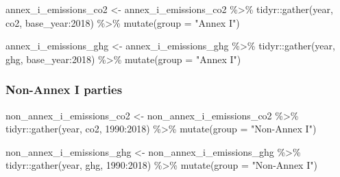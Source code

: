 \documentclass[
  12pt,
]{article}
\newenvironment{Shaded}{}{}
\newcommand{\AttributeTok}[1]{\textcolor[rgb]{0.49,0.56,0.16}{#1}}
\newcommand{\FunctionTok}[1]{\textcolor[rgb]{0.02,0.16,0.49}{#1}}
\newcommand{\NormalTok}[1]{#1}
\newcommand{\OtherTok}[1]{\textcolor[rgb]{0.00,0.44,0.13}{#1}}
\newcommand{\SpecialCharTok}[1]{\textcolor[rgb]{0.25,0.44,0.63}{#1}}
\newcommand{\StringTok}[1]{\textcolor[rgb]{0.25,0.44,0.63}{#1}}
\begin{document}
\begin{Shaded}
\begin{Highlighting}[]
\NormalTok{annex\_i\_emissions\_co2 }\OtherTok{\textless{}{-}}\NormalTok{ annex\_i\_emissions\_co2 }\SpecialCharTok{\%\textgreater{}\%}
\NormalTok{    tidyr}\SpecialCharTok{::}\FunctionTok{gather}\NormalTok{(year, co2, base\_year}\SpecialCharTok{:}\StringTok{\textasciigrave{}}\AttributeTok{2018}\StringTok{\textasciigrave{}}\NormalTok{) }\SpecialCharTok{\%\textgreater{}\%}
    \FunctionTok{mutate}\NormalTok{(}\AttributeTok{group =} \StringTok{"Annex I"}\NormalTok{)}

\NormalTok{annex\_i\_emissions\_ghg }\OtherTok{\textless{}{-}}\NormalTok{ annex\_i\_emissions\_ghg }\SpecialCharTok{\%\textgreater{}\%}
\NormalTok{    tidyr}\SpecialCharTok{::}\FunctionTok{gather}\NormalTok{(year, ghg, base\_year}\SpecialCharTok{:}\StringTok{\textasciigrave{}}\AttributeTok{2018}\StringTok{\textasciigrave{}}\NormalTok{) }\SpecialCharTok{\%\textgreater{}\%}
    \FunctionTok{mutate}\NormalTok{(}\AttributeTok{group =} \StringTok{"Annex I"}\NormalTok{)}
\end{Highlighting}
\end{Shaded}

\hypertarget{non-annex-i-parties-3}{%
\subsubsection{Non-Annex I parties}\label{non-annex-i-parties-3}}

\begin{Shaded}
\begin{Highlighting}[]
\NormalTok{non\_annex\_i\_emissions\_co2 }\OtherTok{\textless{}{-}}\NormalTok{ non\_annex\_i\_emissions\_co2 }\SpecialCharTok{\%\textgreater{}\%}
\NormalTok{    tidyr}\SpecialCharTok{::}\FunctionTok{gather}\NormalTok{(year, co2, }\StringTok{\textasciigrave{}}\AttributeTok{1990}\StringTok{\textasciigrave{}}\SpecialCharTok{:}\StringTok{\textasciigrave{}}\AttributeTok{2018}\StringTok{\textasciigrave{}}\NormalTok{) }\SpecialCharTok{\%\textgreater{}\%}
    \FunctionTok{mutate}\NormalTok{(}\AttributeTok{group =} \StringTok{"Non{-}Annex I"}\NormalTok{)}

\NormalTok{non\_annex\_i\_emissions\_ghg }\OtherTok{\textless{}{-}}\NormalTok{ non\_annex\_i\_emissions\_ghg }\SpecialCharTok{\%\textgreater{}\%}
\NormalTok{    tidyr}\SpecialCharTok{::}\FunctionTok{gather}\NormalTok{(year, ghg, }\StringTok{\textasciigrave{}}\AttributeTok{1990}\StringTok{\textasciigrave{}}\SpecialCharTok{:}\StringTok{\textasciigrave{}}\AttributeTok{2018}\StringTok{\textasciigrave{}}\NormalTok{) }\SpecialCharTok{\%\textgreater{}\%}
    \FunctionTok{mutate}\NormalTok{(}\AttributeTok{group =} \StringTok{"Non{-}Annex I"}\NormalTok{)}
\end{Highlighting}
\end{Shaded}
\end{document}
